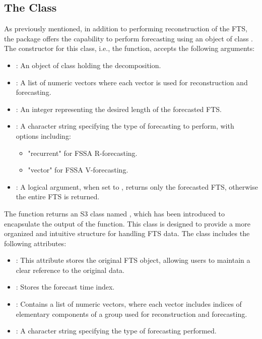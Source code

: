 \subsection{The  Class}
As previously mentioned, in addition to performing reconstruction of the FTS, the package offers the capability to perform forecasting using an object of class . The constructor for this class, i.e., the  function, accepts the following arguments:
\begin{itemize}
	\item {}: An object of class  holding the decomposition.
	\item {}: A list of numeric vectors where each vector is used for reconstruction and forecasting.
	\item {}: An integer representing the desired length of the forecasted FTS.
	\item {}: A character string specifying the type of forecasting to perform, with options including:
	\begin{itemize}
		\item "recurrent" for FSSA R-forecasting.
		\item "vector" for FSSA V-forecasting.
	\end{itemize}
	\item {}: A logical argument, when set to , returns only the forecasted FTS, otherwise the entire FTS is returned.
\end{itemize}
The  function returns an S3 class named , which has been introduced to encapsulate the output of the function. This class is designed to provide a more organized and intuitive structure for handling FTS data. The  class includes the following attributes:
\begin{itemize}
	\item {}: This attribute stores the original FTS object, allowing users to maintain a clear reference to the original data.
	\item {}: Stores the forecast time index.
	\item {}: Contains a list of numeric vectors, where each vector includes indices of elementary components of a group used for reconstruction and forecasting.
	\item {}: A character string specifying the type of forecasting performed.
\end{itemize}
